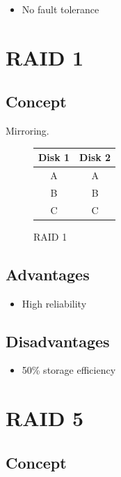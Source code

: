 \begin{itemize}
\item No fault tolerance
\end{itemize}

\section{RAID 1}

\subsection{Concept}

Mirroring.

\begin{figure}[h]
\centering
\begin{tabular}{|c|c|}
\hline
Disk 1 & Disk 2 \\
\hline
A & A \\
B & B \\
C & C \\
\hline
\end{tabular}
\caption{RAID 1}
\end{figure}

\subsection{Advantages}

\begin{itemize}
\item High reliability
\end{itemize}

\subsection{Disadvantages}

\begin{itemize}
\item 50\% storage efficiency
\end{itemize}

\section{RAID 5}

\subsection{Concept}

